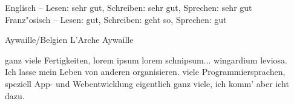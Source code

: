 \documentclass[german]{ecv}
\begin{document}
\begin{ecv}


                        {Englisch -- Lesen: sehr gut, Schreiben: 
                         sehr gut, Sprechen: sehr gut\\
                         Franz"osisch -- Lesen: gut, Schreiben: geht so,
                         Sprechen: gut}



    {Aywaille/Belgien}
                {L'Arche Aywaille}


\ecvPageBreak
{}
                {ganz viele Fertigkeiten, lorem ipsum lorem schnipsum... wingardium leviosa.\\}
                {Ich lasse mein Leben von anderen organisieren.}
                {viele Programmiersprachen, speziell App- und Webentwicklung}
                {eigentlich ganz viele, ich komm' aber icht dazu.
                }



\end{ecv}

\end{document}
